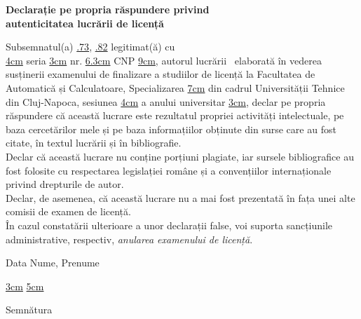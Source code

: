 \begin{center}
	{\bf Declarație pe propria răspundere privind\\ 
		autenticitatea lucrării de licență}
\end{center}
\vspace{1cm}

\begin{minipage}{\linewidth}
	\indent Subsemnatul(a) \uline{.73\linewidth},
	\uline{.82\linewidth} %
	legitimat(ă) cu\\ \uline{4cm} %
	seria \uline{3cm} %
	nr. \uline{6.3cm} %
	CNP \uline{9cm}, %
	autorul lucrării\
	\uline{\linewidth} %
	\uline{\linewidth} %
	elaborată în vederea susținerii examenului de finalizare a studiilor de licență la Facultatea de Automatică și Calculatoare, Specializarea \uline{7cm} %
	din cadrul Universității Tehnice din Cluj-Napoca, sesiunea \uline{4cm} %
	 a anului universitar \uline{3cm}, %
	  declar pe propria răspundere că această lucrare este rezultatul propriei activități intelectuale, pe baza cercetărilor mele și pe baza informațiilor obținute din surse care au fost citate, în textul lucrării și în bibliografie.\\
	\hspace*{8mm} Declar că această lucrare nu conține porțiuni plagiate, iar sursele bibliografice au fost folosite cu respectarea legislației române și a convențiilor internaționale privind drepturile de autor.\\
	\hspace*{8mm} Declar, de asemenea, că această lucrare nu a mai fost prezentată în fața unei alte comisii de examen de licență.\\
	\hspace*{8mm} În cazul constatării ulterioare a unor declarații false, voi suporta sancțiunile administrative, respectiv, \emph{anularea examenului de licență}.
\end{minipage}
\vspace{1.5cm}

Data \hspace{8cm} Nume, Prenume

\vspace{0.5cm}

\uline{3cm} \hspace{5cm} \uline{5cm}

\vspace{1cm}
\hspace{9.4cm}Semnătura
\newpage
